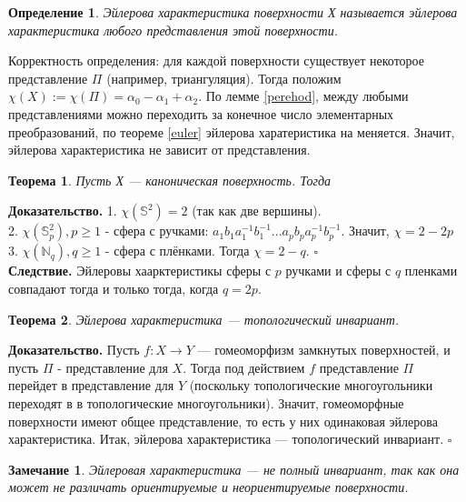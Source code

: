 \documentclass[a4paper]{article}
\newtheorem{defin}{Определение}
\newtheorem{zam}{Замечание}
\newtheorem{theor}{Теорема}
\begin{document}
\begin{defin}
Эйлерова характеристика поверхности Х называется эйлерова характеристика 
любого представления этой поверхности.
\end{defin}
Корректность определения: для каждой поверхности существует некоторое
представление $\Pi$ (например, триангуляция). Тогда положим
$\chi(X):=\chi(\Pi) = \alpha_0 - \alpha_1 + \alpha_2$. По лемме \ref{perehod}, 
между любыми представлениями можно переходить за конечное число 
элементарных преобразований, по теореме \ref{euler} эйлерова харатеристика
на меняется. Значит, эйлерова характеристика не зависит от представления.

\begin{theor}
Пусть Х --- каноническая поверхность. Тогда


\end{theor}
\textbf{Доказательство.}  
1. $\chi(\mathbb{S}^2) = 2$ (так как две вершины). \\
2. $\chi(\mathbb{S}^2_p),p\geqslant 1$ - сфера с ручками:
$a_1b_1a_1^{-1}b_1^{-1}...a_pb_pa_p^{-1}b_p^{-1}$.
Значит, $\chi = 2 - 2p$\\
3. $\chi(\mathbb{N}_q),q\geqslant 1$ - сфера с плёнками. 
Тогда $\chi = 2 - q$. $\square$ \\
\textbf{Следствие.} Эйлеровы хаарктеристикы сферы с $p$ ручками и сферы
с $q$ пленками совпадают тогда и только тогда, когда $q=2p$. 
\begin{theor}\label{euler_invariant}
Эйлерова характеристика --- топологический инвариант.
\end{theor}
\textbf{Доказательство.}  
Пусть $f\colon X\to Y$ --- гомеоморфизм замкнутых поверхностей, и пусть
$\Pi$ - представление для  $X$. Тогда под действием  $f$ 
представление  $\Pi$ перейдет в представление для  $Y$ (поскольку 
топологические многоугольники переходят в в топологические многоугольники). 
Значит, гомеоморфные поверхности имеют общее представление, то есть 
у них одинаковая эйлерова характеристика. Итак, эйлерова характеристика ---
топологический инвариант. $\square$ \\
\begin{zam}
    Эйлеровая характеристика --- не полный инвариант, так как она может не
    различать ориентируемые и неориентируемые поверхности. 
\end{zam}

\end{document}
